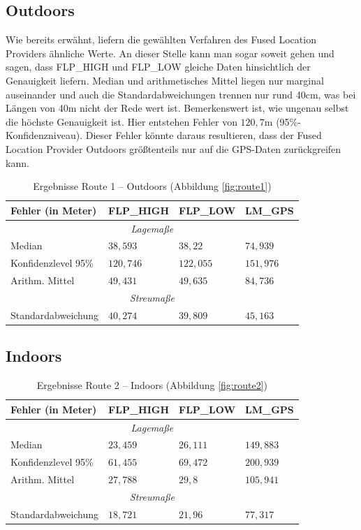 \subsection{Outdoors}

Wie bereits erwähnt, liefern die gewählten Verfahren des Fused Location Providers ähnliche Werte. An dieser Stelle kann man sogar soweit gehen und sagen, dass FLP\_HIGH und FLP\_LOW gleiche Daten hinsichtlich der Genauigkeit liefern. Median und arithmetisches Mittel liegen nur marginal auseinander und auch die Standardabweichungen trennen nur rund 40cm, was bei Längen von 40m nicht der Rede wert ist. Bemerkenswert ist, wie ungenau selbst die höchste Genauigkeit ist. Hier entstehen Fehler von $120,7$m (95\%-Konfidenzniveau). Dieser Fehler könnte daraus resultieren, dass der Fused Location Provider Outdoors größtenteils nur auf die GPS-Daten zurückgreifen kann.

\renewcommand{\arraystretch}{1.2}
\begin{table}[h!]
	\centering
	\caption{Ergebnisse Route 1 -- Outdoors (Abbildung \ref{fig:route1})}
	\begin{tabular}{|l|l|l|l|}
	\hline
	Fehler (in Meter) & FLP\_HIGH & FLP\_LOW & LM\_GPS \\
	\hline
	\multicolumn{4}{|c|}{\textit{Lagemaße}}\\
	\hline
	Median & $38,593$ & $38,22$ & $74,939$ \\
	Konfidenzlevel 95\% & $120,746$ & $122,055$ & $151,976$ \\
	Arithm. Mittel & $49,431$ & $49,635$ & $84,736$ \\
	\hline
	\multicolumn{4}{|c|}{\textit{Streumaße}}\\
	\hline
	Standardabweichung & $40,274$ & $39,809$ & $45,163$ \\
	\hline
	\end{tabular}
\end{table}

\subsection{Indoors}


\begin{table}[h!]
	\centering
	\caption{Ergebnisse Route 2 -- Indoors (Abbildung \ref{fig:route2})}
	\begin{tabular}{|l|l|l|l|}
	\hline
	Fehler (in Meter) & FLP\_HIGH & FLP\_LOW & LM\_GPS \\
	\hline
	\multicolumn{4}{|c|}{\textit{Lagemaße}}\\
	\hline
	Median & $23,459$ & $26,111$ & $149,883$ \\
	Konfidenzlevel 95\% & $61,455$ & $69,472$ & $200,939$ \\
	Arithm. Mittel & $27,788$ & $29,8$ & $105,941$ \\
	\hline
	\multicolumn{4}{|c|}{\textit{Streumaße}}\\
	\hline
	Standardabweichung & $18,721$ & $21,96$ & $77,317$ \\
	\hline
	\end{tabular}
\end{table}
	
